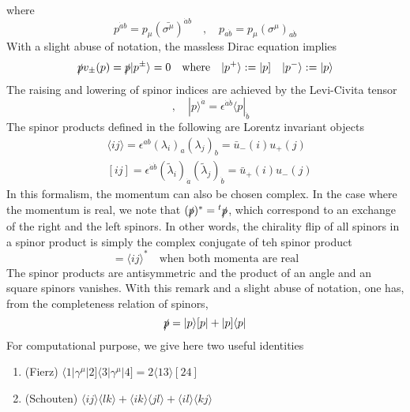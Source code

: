 where 
\begin{equation*}
p^{\dot{a}b} = p_\mu(\bar{\sigma^\mu})^{\dot{a}b}
\quad,\quad
p_{a\dot{b}} = p_\mu(\sigma^\mu)_{a\dot{b}}
\end{equation*}
With a slight abuse of notation, the massless Dirac equation implies
\begin{equation*}
\slashed{p}v_\pm (p) = \slashed{p}|p^\pm\rangle = 0
\quad \mathrm{where}\quad
|p^+\rangle := |p]
\quad
|p^-\rangle := |p\rangle
\end{equation*}
The raising and lowering of spinor indices are achieved by the Levi-Civita tensor
\begin{equation*}
[p|^a = \epsilon^{ab}|p] \quad,\quad
|p\rangle^{\dot{a}} = \epsilon^{\dot{a}\dot{b}}\langle p |_{\dot{b}}
\end{equation*}
The spinor products defined in the following are Lorentz invariant objects
\begin{equation*}
\begin{split}
& \langle ij \rangle = \epsilon^{ab}(\lambda_i)_a(\lambda_j)_b = \bar{u}_-(i)u_+(j)
\\
& [ij] = \epsilon^{\dot{a}\dot{b}}(\tilde{\lambda}_i)_{\dot{a}}(\tilde{\lambda}_j)_{\dot{b}} = \bar{u}_+(i)u_-(j)
\end{split}
\end{equation*}
In this formalism, the momentum can also be chosen complex. 
In the case where the momentum is real, we note that
$(\slashed{p})^* = {}^t\slashed{p}$, which correspond to an exchange of the right and the left spinors. 
In other words, the chirality flip of all spinors in a spinor product is simply the complex conjugate of teh spinor product
\begin{equation*}
[ij] = \langle ij \rangle^* \quad\textrm{when both momenta are real}
\end{equation*}
The spinor products are antisymmetric and the product of an angle and an square spinors vanishes. 
With this remark and a slight abuse of notation, one has, from the completeness relation of spinors,
\begin{equation}\label{p_splinors}
\slashed{p} = |p\rangle [p| + |p]\langle p|
\end{equation}
For computational purpose, we give here two useful identities
\begin{enumerate}
\item (Fierz) $\langle 1 |\gamma^\mu |2]\langle 3 |\gamma^\mu|4] = 2\langle 13 \rangle [24]$
\item (Schouten) $\langle ij \rangle \langle lk \rangle + \langle ik\rangle \langle jl\rangle + \langle il \rangle \langle kj \rangle$
\end{enumerate}
